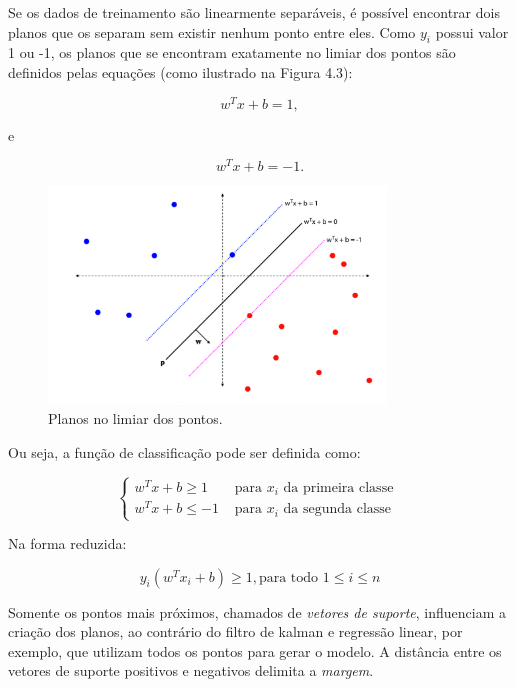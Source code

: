 Se os dados de treinamento são linearmente separáveis, é possível encontrar dois planos que os separam sem existir nenhum ponto entre eles. Como ${y}_{i}$ possui valor 1 ou -1, os planos que se encontram exatamente no limiar dos pontos são definidos pelas equações (como ilustrado na Figura 4.3):

\begin{equation*}
{w}^{T}x + b = 1,
\end{equation*}

e

\begin{equation*}
{w}^{T}x + b = -1.
\end{equation*}

\begin{figure}[htpb]
	\begin{center}
		\includegraphics[width=0.8\textwidth]{figuras/svm-plans-2.pdf}
		\caption{Planos no limiar dos pontos.}
	\end{center}
\end{figure}

Ou seja, a função de classificação pode ser definida como:

\begin{equation*}
  \begin{cases}
	{w}^{T}x + b \geq 1 & \text{ para ${x}_{i}$ da primeira classe }  \\ 
	{w}^{T}x + b \leq -1 & \text{ para ${x}_{i}$ da segunda classe }
	\end{cases}
\end{equation*} 
	
Na forma reduzida:

\begin{equation*}
	{y}_{i}({w}^{T}{x}_{i} + b) \geq 1, \text{para todo } 1 \leq i \leq n
\end{equation*}

Somente os pontos mais próximos, chamados de \textit{vetores de suporte}, influenciam a criação dos planos, ao contrário do filtro de kalman e regressão linear, por exemplo, que utilizam todos os pontos para gerar o modelo. A distância entre os vetores de suporte positivos e negativos delimita a \textit{margem}.

